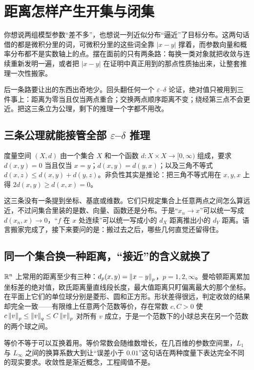\section{距离怎样产生开集与闭集}
\label{sec:12-Real-Analysis-Support/03-Topology-Basics/01}

你想说两组模型参数``差不多''，也想说一列近似分布``逼近''了目标分布。这两句话借的都是微积分里的词，可微积分里的这些词全靠 \(|x-y|\) 撑着，而参数向量和概率分布都不是实数轴上的点。摆在面前的只有两条路：每换一类对象就把收敛与连续重新发明一遍，或者把 \(|x-y|\) 在证明中真正用到的那点性质抽出来，让整套推理一次性搬家。

后一条路要让出的东西出奇地少。回头翻任何一个 \(\varepsilon\)--\(\delta\) 论证，绝对值只被用到三件事上：距离为零当且仅当两点重合；交换两点顺序距离不变；绕经第三点不会更近。把这三条立为公理，剩下的推理一个字都不用改。

\subsection{三条公理就能接管全部 \(\varepsilon\)--\(\delta\) 推理}

度量空间 \((X,d)\) 由一个集合 \(X\) 和一个函数 \(d:X\times X\to[0,\infty)\) 组成，要求 \(d(x,y)=0\) 当且仅当 \(x=y\)；\(d(x,y)=d(y,x)\)；以及三角不等式 \(d(x,z)\le d(x,y)+d(y,z)\)。非负性其实是推论：把三角不等式用在 \(x,y,x\) 上得 \(2d(x,y)\ge d(x,x)=0\)。

这三条没有一条提到坐标、基底或维数。它们只规定集合上任意两点之间怎么算远近，不过问集合里装的是数、向量、函数还是分布。于是``\(x_n\to x\)''可以统一写成 \(d(x_n,x)\to0\)，``\(f\) 在 \(x\) 处连续''可以统一写成小的 \(d_X\) 距离推出小的 \(d_Y\) 距离。语言搬家完成了，接下来要问的是：搬过去之后，哪些几何直觉还留得住。

\subsection{同一个集合换一种距离，``接近''的含义就换了}

\(\mathbb{R}^n\) 上常用的距离至少有三种：\(d_p(x,y)=\left\lVert x-y\right\rVert_p\)，\(p=1,2,\infty\)。曼哈顿距离累加坐标差的绝对值，欧氏距离量直线段长度，最大值距离只盯偏离最大的那个坐标。在平面上它们的单位球分别是菱形、圆和正方形。形状差得很远，判定收敛的结果却完全一致——有限维上任意两个范数等价，存在常数 \(c,C>0\) 使 \(c\left\lVert v\right\rVert_p\le\left\lVert v\right\rVert_q\le C\left\lVert v\right\rVert_p\) 对所有 \(v\) 成立，于是一个范数下的小球总夹在另一个范数的两个球之间。

等价不等于可以互换着用。等价常数会随维数增长，在几百维的参数空间里，\(L_1\) 与 \(L_\infty\) 之间的换算系数大到让``误差小于 \(0.01\)''这句话在两种度量下表达完全不同的现实要求。收敛性是渐近概念，工程阈值不是。

